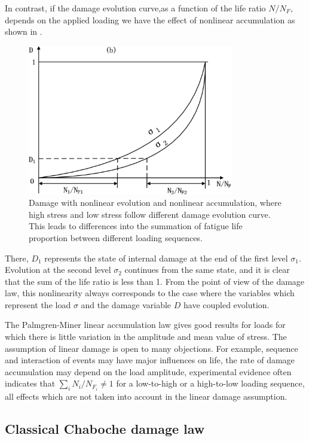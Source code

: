 In contrast, if the damage evolution curve,as a function of the life ratio $N/N_F$, depends on the applied loading we have the effect of nonlinear accumulation as shown in . 
\begin{figure}[!h]
	\centering
	\includegraphics[width=0.8\textwidth]{figures//nonlinearaccumulation.png} 
	\caption{Damage with nonlinear evolution and nonlinear accumulation, where high stress and low stress follow different damage evolution curve. This leads to differences into the summation of fatigue life proportion between different loading sequences.}
	\label{nonlinear accumulation}
\end{figure}
There, $D_1$ represents the state of internal damage at the end of the first level $\sigma_1$. Evolution at the second level $\sigma_2$ continues from the same state, and it is clear that the sum of the life ratio is less than 1. From the point of view of the damage law, this nonlinearity always corresponds to the case where the variables which represent the load $\sigma$ and the damage variable $D$ have coupled evolution.

The Palmgren-Miner linear accumulation law gives good results for loads for which there is little variation in the amplitude and mean value of stress. The assumption of linear damage is open to many objections. For example, sequence and interaction of events may have major influences on life, the rate of damage accumulation may depend on the load amplitude, experimental evidence often indicates that $\sum_{i}N_i/N_{F_i}\neq 1$ for a low-to-high or a high-to-low loading sequence, all effects which are not taken into account in the linear damage assumption.

\newpage
\subsection{Classical Chaboche damage law}

